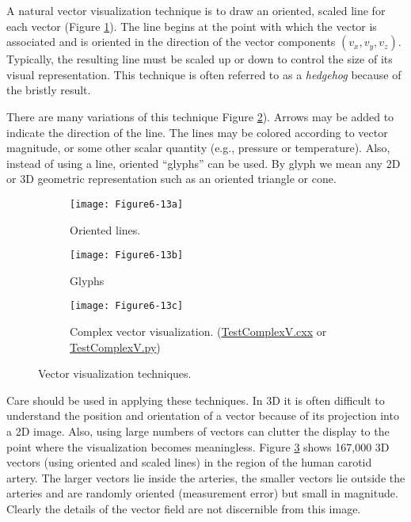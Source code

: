 A natural vector visualization technique is to draw an oriented,
scaled line for each vector (Figure \ref{fig:Figure6-13a}). The line begins at the point with which the vector is associated and is oriented in the direction of the vector components $(v_x, v_y, v_z)$. Typically, the resulting line must be scaled up or down to control the size of its visual representation. This technique is often referred to as a \emph{hedgehog} because of the bristly result.

There are many variations of this technique Figure \ref{fig:Figure6-13b}). Arrows may be added to indicate the direction of the line. The lines may be colored according to vector magnitude, or some other scalar quantity (e.g., pressure or temperature). Also, instead of using a line, oriented ``glyphs'' can be used. By glyph we mean any 2D or 3D geometric representation such as an oriented triangle or cone.

\begin{figure}[htb]
	\begin{subfigure}[h]{0.24\linewidth}
		\texttt{[image: Figure6-13a]}
		\caption{Oriented lines.}\label{fig:Figure6-13a}
	\end{subfigure}
	\hfill
	\begin{subfigure}[h]{0.24\linewidth}
		\texttt{[image: Figure6-13b]}
		\caption{Glyphs}\label{fig:Figure6-13b}
	\end{subfigure}%
	\hfill
	\begin{subfigure}[h]{0.48\linewidth}
		\texttt{[image: Figure6-13c]}
		\caption{Complex vector visualization. (\href{https://lorensen.github.io/VTKExamples/site/Cxx/Visualization/TestComplexV}{TestComplexV.cxx} or \href{https://lorensen.github.io/VTKExamples/site/Python/Visualization/TestComplexV/}{TestComplexV.py})}\label{fig:Figure6-13c}
	\end{subfigure}
	\caption{Vector visualization techniques.}\label{fig:Figure6-13}
\end{figure}

Care should be used in applying these techniques. In 3D it is often difficult to understand the position and orientation of a vector because of its projection into a 2D image. Also, using large numbers of vectors can clutter the display to the point where the visualization becomes meaningless. Figure \ref{fig:Figure6-13c} shows 167,000 3D vectors (using oriented and scaled lines) in the region of the human carotid artery. The larger vectors lie inside the arteries, the smaller vectors lie outside the arteries and are randomly oriented (measurement error) but small in magnitude. Clearly the details of the vector field are not discernible from this image.

